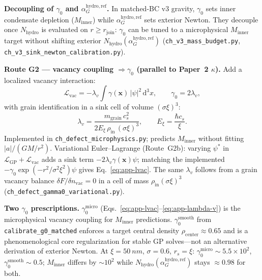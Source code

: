 \documentclass[11pt,a4paper]{article}
\begin{document}
\textbf{Decoupling of $\gamma_0$ and $\alpha_G^{\mathrm{hydro,ref}}$.}
In matched-BC v3 gravity, $\gamma_0$ sets inner condensate depletion ($M_{\mathrm{inner}}$) while $\alpha_G^{\mathrm{hydro,ref}}$ sets exterior Newton.
They decouple once $N_{\mathrm{hydro}}$ is evaluated on $r \geq r_{\mathrm{join}}$: $\gamma_0$ can be tuned to a microphysical $M_{\mathrm{inner}}$ target without shifting exterior $N_{\mathrm{hydro}}(\alpha_G^{\mathrm{hydro,ref}})$ (\texttt{ch\_v3\_mass\_budget.py}, \texttt{ch\_v3\_sink\_newton\_calibration.py}).

\textbf{Route G2 --- vacancy coupling $\Rightarrow \gamma_0$ (parallel to Paper~2 $\kappa$).}
Add a localized vacancy interaction:
\begin{equation}
  \mathcal{L}_{\mathrm{vac}} = -\lambda_v \int \gamma(\mathbf{x})\,|\psi|^2\,\mathrm{d}^3 x,
  \qquad
  \gamma_0 = 2\lambda_v,
  \label{eq:app-lvac}
\end{equation}
with grain identification in a sink cell of volume $(\sigma\xi)^3$:
\begin{equation}
  \lambda_v = \frac{m_{\mathrm{grain}}\, c_s^2}{2 E_\xi\, \rho_{\mathrm{in}}\, (\sigma\xi)^3},
  \qquad
  E_\xi = \frac{\hbar c_s}{\xi}.
  \label{eq:app-lambda-v}
\end{equation}
Implemented in \texttt{ch\_defect\_microphysics.py}; predicts $M_{\mathrm{inner}}$ without fitting $|a|/(GM/r^2)$.
Variational Euler--Lagrange (Route~G2b): varying $\psi^*$ in $\mathcal{L}_{\mathrm{GP}} + \mathcal{L}_{\mathrm{vac}}$ adds a sink term $-2\lambda_v \gamma(\mathbf{x})\psi$; matching the implemented $-\gamma_0 \exp(-r^2/\sigma^2\xi^2)\psi$ gives Eq.~\ref{eq:app-lvac}.
The same $\lambda_v$ follows from a grain vacancy balance $\delta F/\delta n_{\mathrm{vac}} = 0$ in a cell of mass $\rho_{\mathrm{in}}(\sigma\xi)^3$ (\texttt{ch\_defect\_gamma0\_variational.py}).

\textbf{Two $\gamma_0$ prescriptions.}
$\gamma_0^{\mathrm{micro}}$ (Eqs.~\ref{eq:app-lvac}--\ref{eq:app-lambda-v}) is the microphysical vacancy coupling for $M_{\mathrm{inner}}$ predictions.
$\gamma_0^{\mathrm{smooth}}$ from \texttt{calibrate\_g0\_matched} enforces a target central density $\rho_{\mathrm{center}} \approx 0.65$ and is a phenomenological core regularization for stable GP solves---not an alternative derivation of exterior Newton.
At $\xi = \SI{50}{nm}$, $\sigma = 0.6$, $r_s = \xi$: $\gamma_0^{\mathrm{micro}} \sim 5.5 \times 10^2$, $\gamma_0^{\mathrm{smooth}} \sim 0.5$; $M_{\mathrm{inner}}$ differs by $\sim 10^2$ while $N_{\mathrm{hydro}}(\alpha_G^{\mathrm{hydro,ref}})$ stays $\approx 0.98$ for both.
\end{document}
